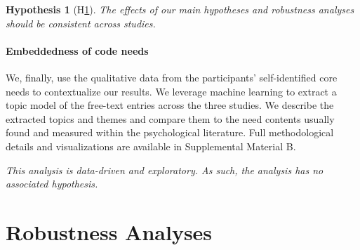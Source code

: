\documentclass[man, 12pt, a4paper, mask]{apa7}
\theoremstyle{break}
\theoremstyle{plain}
\newtheorem{hyp}{Hypothesis}
\begin{document}
\begin{mdframed}[style=mdfhypothesis]
    \begin{hyp}[H\ref{hyp:Stability}] \label{hyp:Stability}
    \addtolength{\leftskip}{1em}
    The effects of our main hypotheses and robustness analyses should be consistent across studies.
    \end{hyp}
\end{mdframed}

\paragraph{Embeddedness of code needs}
We, finally, use the qualitative data from the participants' self-identified core needs to contextualize our results. We leverage machine learning to extract a topic model of the free-text entries across the three studies. We describe the extracted topics and themes and compare them to the need contents usually found and measured within the psychological literature. Full methodological details and visualizations are available in Supplemental Material B.

\begin{mdframed}[style=mdfhypothesis]
    \addtolength{\leftskip}{1em}
    \textit{This analysis is data-driven and exploratory. As such, the analysis has no associated hypothesis.}
\end{mdframed}



\section{Robustness Analyses}
\label{app:AppendixRobustness}
\end{document}
